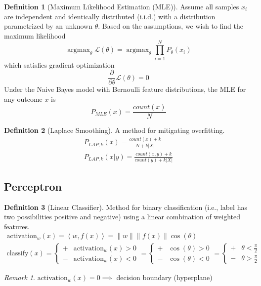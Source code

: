 \documentclass[11pt]{article}
\theoremstyle{definition}
\newtheorem{definition}{Definition}[section]
\theoremstyle{remark}
\newtheorem*{remark}{Remark}
\DeclareMathOperator*{\argmax}{argmax}
\begin{document}
\begin{definition}[Maximum Likelihood Estimation (MLE)]
Assume all samples $x_i$ are independent and identically distributed (i.i.d.) with a distribution parametrized by an unknown $\theta$. Based on the assumptions, we wish to find the maximum likelihood
\[
\argmax_\theta \mathcal{L}(\theta) = \argmax_\theta \prod_{i=1}^N P_\theta(x_i)
\]
which satisfies gradient optimization
\[
\frac{\partial}{\partial\theta} \mathcal{L}(\theta) = 0
\]
Under the Naive Bayes model with Bernoulli feature distributions, the MLE for any outcome $x$ is
\[
P_{MLE}(x) = \frac{count(x)}{N}
\]
\end{definition}

\begin{definition}[Laplace Smoothing] A method for mitigating overfitting.
\begin{align*}
P_{LAP,k}(x) = \frac{count(x)+k}{N+k|X|}\\
P_{LAP,k}(x|y) = \frac{count(x,y)+k}{count(y)+k|X|}
\end{align*}
\end{definition}

\subsection{Perceptron}
\begin{definition}[Linear Classifier]
Method for binary classification (i.e., label has two possibilities positive and negative) using a linear combination of weighted features.
\begin{align*}
\mathrm{activation}_w(x) = \left< w,f(x) \right> = \lVert w \rVert \lVert f(x) \rVert \cos(\theta) \\
\mathrm{classify}(x) = \begin{cases}
+ & \mathrm{activation}_w(x) > 0 \\
- & \mathrm{activation}_w(x) < 0
\end{cases} = \begin{cases}
+ & \cos(\theta) > 0 \\
- & \cos(\theta) < 0 
\end{cases} = \begin{cases}
+ & \theta < \frac{\pi}{2} \\
- & \theta > \frac{\pi}{2}
\end{cases}
\end{align*}
\end{definition}

\begin{remark}
$\mathrm{activation}_w(x) = 0 \implies$ decision boundary (hyperplane)
\end{remark}
\end{document}
